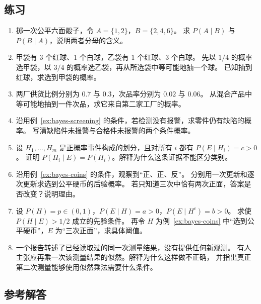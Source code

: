 \documentclass[UTF8,12pt,a4paper,fontset=fandol]{ctexart}
\begin{document}
\subsection{练习}

\begin{enumerate}
  \item \label{exr:bayes-die}
  掷一次公平六面骰子，令 $A=\{1,2\}$，$B=\{2,4,6\}$。
  求 $P(A\mid B)$ 与 $P(B\mid A)$，说明两者分母的含义。

  \item \label{exr:bayes-bags}
  甲袋有 $3$ 个红球、$1$ 个白球，乙袋有 $1$ 个红球、$3$ 个白球。
  先以 $1/4$ 的概率选甲袋，以 $3/4$ 的概率选乙袋，再从所选袋中等可能地抽一个球。
  已知抽到红球，求选到甲袋的概率。

  \item \label{exr:bayes-factories}
  两厂供货比例分别为 $0.7$ 与 $0.3$，次品率分别为 $0.02$ 与 $0.06$。
  从混合产品中等可能地抽到一件次品，求它来自第二家工厂的概率。

  \item \label{exr:bayes-negative}
  沿用例~\ref{ex:bayes-screening} 的条件，若检测没有报警，求零件仍有缺陷的概率。
  写清缺陷件未报警与合格件未报警的两个条件概率。

  \item \label{exr:bayes-neutral}
  设 $H_1,\ldots,H_m$ 是正概率事件构成的划分，且对所有 $i$ 都有 $P(E\mid H_i)=c>0$。
  证明 $P(H_i\mid E)=P(H_i)$。解释为什么这条证据不能区分类别。

  \item \label{exr:bayes-sequence}
  沿用例~\ref{ex:bayes-coins} 的条件，观察到“正、正、反”。
  分别用一次更新和逐次更新求选到公平硬币的后验概率。
  若只知道三次中恰有两次正面，答案是否改变？说明理由。

  \item \label{exr:bayes-threshold}
  设 $P(H)=p\in(0,1)$，$P(E\mid H)=a>0$，$P(E\mid H^c)=b>0$。
  求使 $P(H\mid E)>1/2$ 成立的先验条件。
  再令 $H$ 为例~\ref{ex:bayes-coins} 中“选到公平硬币”，$E$ 为“三次正面”，求具体阈值。

  \item \label{exr:bayes-repeat}
  一个报告转述了已经读取过的同一次测量结果，没有提供任何新观测。
  有人主张应再乘一次该测量结果的似然。解释为什么这样做不正确，
  并指出真正第二次测量能够使用似然乘法需要什么条件。
\end{enumerate}

\subsection{参考解答}
\end{document}
